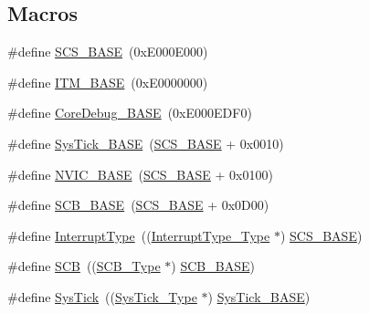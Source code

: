 \subsection*{Macros}
\begin{DoxyCompactItemize}
\item 
\#define \hyperlink{group__CMSIS__CM3__core__register_ga3c14ed93192c8d9143322bbf77ebf770}{S\+C\+S\+\_\+\+B\+A\+SE}~(0x\+E000\+E000)
\item 
\#define \hyperlink{group__CMSIS__CM3__core__register_gadd76251e412a195ec0a8f47227a8359e}{I\+T\+M\+\_\+\+B\+A\+SE}~(0x\+E0000000)
\item 
\#define \hyperlink{group__CMSIS__CM3__core__register_ga680604dbcda9e9b31a1639fcffe5230b}{Core\+Debug\+\_\+\+B\+A\+SE}~(0x\+E000\+E\+D\+F0)
\item 
\#define \hyperlink{group__CMSIS__CM3__core__register_ga58effaac0b93006b756d33209e814646}{Sys\+Tick\+\_\+\+B\+A\+SE}~(\hyperlink{group__CMSIS__CM3__core__register_ga3c14ed93192c8d9143322bbf77ebf770}{S\+C\+S\+\_\+\+B\+A\+SE} +  0x0010)
\item 
\#define \hyperlink{group__CMSIS__CM3__core__register_gaa0288691785a5f868238e0468b39523d}{N\+V\+I\+C\+\_\+\+B\+A\+SE}~(\hyperlink{group__CMSIS__CM3__core__register_ga3c14ed93192c8d9143322bbf77ebf770}{S\+C\+S\+\_\+\+B\+A\+SE} +  0x0100)
\item 
\#define \hyperlink{group__CMSIS__CM3__core__register_gad55a7ddb8d4b2398b0c1cfec76c0d9fd}{S\+C\+B\+\_\+\+B\+A\+SE}~(\hyperlink{group__CMSIS__CM3__core__register_ga3c14ed93192c8d9143322bbf77ebf770}{S\+C\+S\+\_\+\+B\+A\+SE} +  0x0\+D00)
\item 
\#define \hyperlink{group__CMSIS__CM3__core__register_ga164238adbad56f07c7dd4e912af748dd}{Interrupt\+Type}~((\hyperlink{structInterruptType__Type}{Interrupt\+Type\+\_\+\+Type} $\ast$) \hyperlink{group__CMSIS__CM3__core__register_ga3c14ed93192c8d9143322bbf77ebf770}{S\+C\+S\+\_\+\+B\+A\+SE})
\item 
\#define \hyperlink{group__CMSIS__CM3__core__register_gaaaf6477c2bde2f00f99e3c2fd1060b01}{S\+CB}~((\hyperlink{structSCB__Type}{S\+C\+B\+\_\+\+Type} $\ast$)           \hyperlink{group__CMSIS__CM3__core__register_gad55a7ddb8d4b2398b0c1cfec76c0d9fd}{S\+C\+B\+\_\+\+B\+A\+SE})
\item 
\#define \hyperlink{group__CMSIS__CM3__core__register_gacd96c53beeaff8f603fcda425eb295de}{Sys\+Tick}~((\hyperlink{structSysTick__Type}{Sys\+Tick\+\_\+\+Type} $\ast$)       \hyperlink{group__CMSIS__CM3__core__register_ga58effaac0b93006b756d33209e814646}{Sys\+Tick\+\_\+\+B\+A\+SE})

\end{DoxyCompactItemize}
